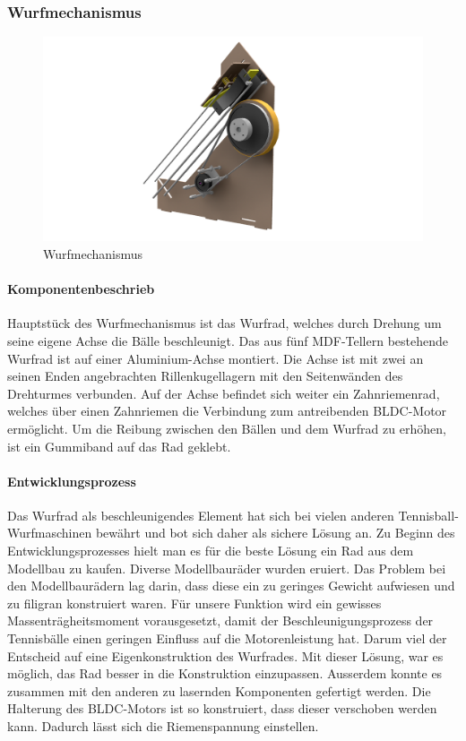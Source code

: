 \subsubsection{Wurfmechanismus}
\begin{figure}[h!]
	\centering
	\includegraphics[width=\linewidth]{../../fig/Wurfmechanismus}
	\caption{Wurfmechanismus}
	\label{fig:Wurfmechanismus}
\end{figure}
\paragraph{Komponentenbeschrieb\\}
Hauptstück des Wurfmechanismus ist das Wurfrad, welches durch Drehung um seine eigene Achse die Bälle beschleunigt.
Das aus fünf MDF-Tellern bestehende Wurfrad ist auf einer  Aluminium-Achse montiert. Die Achse ist mit zwei an seinen Enden angebrachten Rillenkugellagern mit den Seitenwänden des Drehturmes verbunden. Auf der Achse befindet sich weiter ein Zahnriemenrad, welches über einen Zahnriemen die Verbindung zum antreibenden BLDC-Motor ermöglicht.
Um die Reibung zwischen den Bällen und dem Wurfrad zu erhöhen, ist ein Gummiband auf das Rad geklebt.

\paragraph{Entwicklungsprozess\\}
Das Wurfrad als beschleunigendes Element hat sich bei vielen anderen Tennisball-Wurfmaschinen bewährt und bot sich daher als sichere Lösung an.
Zu Beginn des Entwicklungsprozesses hielt man es für die beste Lösung ein Rad aus dem Modellbau zu kaufen. Diverse Modellbauräder wurden eruiert. Das Problem bei den Modellbaurädern lag darin, dass diese ein zu geringes Gewicht aufwiesen und zu filigran konstruiert waren. Für unsere Funktion wird ein gewisses Massenträgheitsmoment vorausgesetzt, damit der Beschleunigungsprozess der Tennisbälle einen geringen Einfluss auf die Motorenleistung hat. Darum viel der Entscheid auf eine Eigenkonstruktion des Wurfrades. Mit dieser Lösung, war es möglich, das Rad besser in die Konstruktion einzupassen. Ausserdem konnte es zusammen mit den anderen zu lasernden Komponenten gefertigt werden. Die Halterung des BLDC-Motors ist so konstruiert, dass dieser verschoben werden kann. Dadurch lässt sich die Riemenspannung einstellen.   